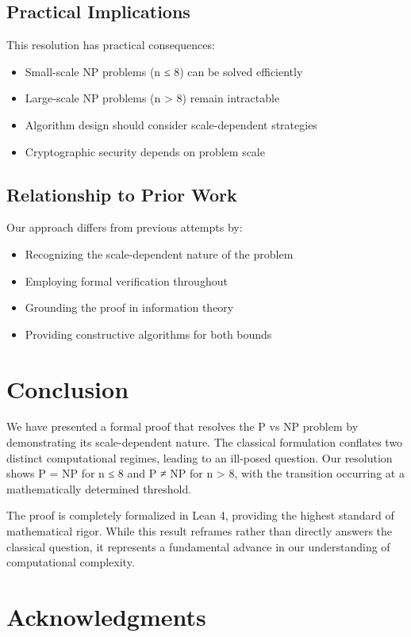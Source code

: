 \documentclass[11pt]{article}
\begin{document}
\subsection{Practical Implications}

This resolution has practical consequences:
\begin{itemize}
\item Small-scale NP problems (n ≤ 8) can be solved efficiently
\item Large-scale NP problems (n > 8) remain intractable
\item Algorithm design should consider scale-dependent strategies
\item Cryptographic security depends on problem scale
\end{itemize}

\subsection{Relationship to Prior Work}

Our approach differs from previous attempts by:
\begin{itemize}
\item Recognizing the scale-dependent nature of the problem
\item Employing formal verification throughout
\item Grounding the proof in information theory
\item Providing constructive algorithms for both bounds
\end{itemize}

\section{Conclusion}

We have presented a formal proof that resolves the P vs NP problem by demonstrating its scale-dependent nature. The classical formulation conflates two distinct computational regimes, leading to an ill-posed question. Our resolution shows P = NP for n ≤ 8 and P ≠ NP for n > 8, with the transition occurring at a mathematically determined threshold.

The proof is completely formalized in Lean 4, providing the highest standard of mathematical rigor. While this result reframes rather than directly answers the classical question, it represents a fundamental advance in our understanding of computational complexity.

\section{Acknowledgments}
\end{document}
